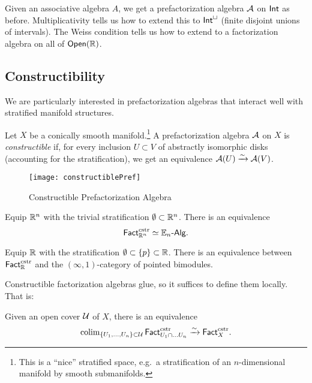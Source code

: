 \begin{ex}
	Given an associative algebra $A$, we get a prefactorization algebra $\mathcal{A}$ on $\mathsf{Int}$ as before.
	Multiplicativity tells us how to extend this to $\mathsf{Int}^{\sqcup}$ (finite disjoint unions of intervals).
	The Weiss condition tells us how to extend to a factorization algebra on all of $\mathsf{Open}(\mathbb{R})$.
\end{ex}

\subsection{Constructibility}

We are particularly interested in prefactorization algebras that interact well with stratified manifold structures.

\begin{dfn}
	Let $X$ be a conically smooth manifold.\footnote{This is a ``nice'' stratified space, e.g.\ a stratification of an $n$-dimensional manifold by smooth submanifolds.}
	A prefactorization algebra $\mathcal{A}$ on $X$ is \emph{constructible} if, for every inclusion $U \subset V$ of abstractly isomorphic disks (accounting for the stratification), we get an equivalence $\mathcal{A}(U) \xrightarrow{\sim} \mathcal{A}(V)$.
\end{dfn}
\begin{figure}[h]
	\centering
	\texttt{[image: constructiblePref]}
	\caption{Constructible Prefactorization Algebra}
	\label{fig:constructiblePref}
\end{figure}

\begin{thm}[Lurie]
	Equip $\mathbb{R}^n$ with the trivial stratification $\emptyset \subset \mathbb{R}^n$.
	There is an equivalence
	\[
		\mathsf{Fact}_{\mathbb{R}^n}^{\mathrm{cstr}} \simeq \mathbb{E}_n\textrm{-}\mathsf{Alg}.
	\]
\end{thm}

\begin{thm}
	Equip $\mathbb{R}$ with the stratification $\emptyset \subset \{ p \} \subset \mathbb{R}$.
	There is an equivalence between $\mathsf{Fact}_{\mathbb{R}}^{\mathrm{cstr}}$ and the $(\infty, 1)$-category of pointed bimodules. 
\end{thm}

Constructible factorization algebras glue, so it suffices to define them locally.
That is:

\begin{thm}
	Given an open cover $\mathcal{U}$ of $X$, there is an equivalence
	\[
		\operatorname{colim}_{\{U_1, \dots, U_n\} \subset \mathcal{U}} \mathsf{Fact}_{U_1 \cap \dots U_n}^{\mathrm{cstr}} \xrightarrow{\sim} \mathsf{Fact}_X^{\mathrm{cstr}}.
	\]
\end{thm}

